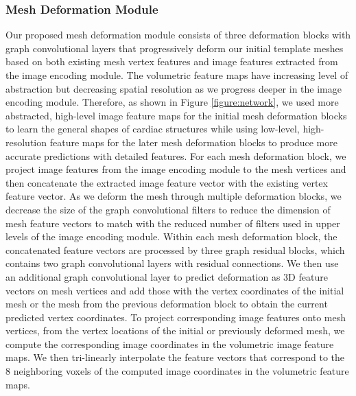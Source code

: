 \documentclass[times,review,preprint,authoryear]{elsarticle}
\begin{document}
\subsubsection{Mesh Deformation Module}
Our proposed mesh deformation module consists of three deformation blocks with graph convolutional layers that progressively deform our initial template meshes based on both existing mesh vertex features and image features extracted from the image encoding module.  The volumetric feature maps have increasing level of abstraction but decreasing spatial resolution as we progress deeper in the image encoding module. Therefore, as shown in Figure \ref{figure:network}, we used more abstracted, high-level image feature maps for the initial mesh deformation blocks to learn the general shapes of cardiac structures while using low-level, high-resolution feature maps for the later mesh deformation blocks to produce more accurate predictions with detailed features. For each mesh deformation block, we project image features from the image encoding module to the mesh vertices and then concatenate the extracted image feature vector with the existing vertex feature vector. As we deform the mesh through multiple deformation blocks, we decrease the size of the graph convolutional filters to reduce the dimension of mesh feature vectors to match with the reduced number of filters used in upper levels of the image encoding module. Within each mesh deformation block, the concatenated feature vectors are processed by three graph residual blocks, which contains two graph convolutional layers with residual connections. We then use an additional graph convolutional layer to predict deformation as 3D feature vectors on mesh vertices and add those with the vertex coordinates of the initial mesh or the mesh from the previous deformation block to obtain the current predicted vertex coordinates. To project corresponding image features onto mesh vertices, from the vertex locations of the initial or previously deformed mesh, we compute the corresponding image coordinates in the volumetric image feature maps. We then tri-linearly interpolate the feature vectors that correspond to the 8 neighboring voxels of the computed image coordinates in the volumetric feature maps. 
\end{document}
